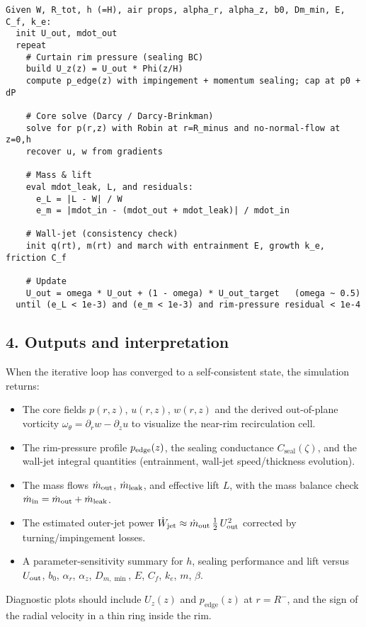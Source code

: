 \documentclass[11pt,a4paper]{article}
\begin{document}
\newpage
\begin{lstlisting}[style=codeblock,
  caption={Solver outline (code-ready)},
  label={lst:solver-outline}]
Given W, R_tot, h (=H), air props, alpha_r, alpha_z, b0, Dm_min, E, C_f, k_e:
  init U_out, mdot_out
  repeat
    # Curtain rim pressure (sealing BC)
    build U_z(z) = U_out * Phi(z/H)
    compute p_edge(z) with impingement + momentum sealing; cap at p0 + dP

    # Core solve (Darcy / Darcy-Brinkman)
    solve for p(r,z) with Robin at r=R_minus and no-normal-flow at z=0,h
    recover u, w from gradients

    # Mass & lift
    eval mdot_leak, L, and residuals:
      e_L = |L - W| / W
      e_m = |mdot_in - (mdot_out + mdot_leak)| / mdot_in

    # Wall-jet (consistency check)
    init q(rt), m(rt) and march with entrainment E, growth k_e, friction C_f

    # Update
    U_out = omega * U_out + (1 - omega) * U_out_target   (omega ~ 0.5)
  until (e_L < 1e-3) and (e_m < 1e-3) and rim-pressure residual < 1e-4
\end{lstlisting}




\subsection*{4. Outputs and interpretation}
When the iterative loop has converged to a self-consistent state, the simulation returns:
\begin{itemize}
  \item The core fields \(p(r,z)\), \(u(r,z)\), \(w(r,z)\) and the derived out-of-plane vorticity \(\omega_\theta=\partial_r w-\partial_z u\) to visualize the near-rim recirculation cell.
  \item The rim-pressure profile \(p_{\rm edge}(z)\), the sealing conductance \(C_{\mathrm{seal}}(\zeta)\), and the wall-jet integral quantities (entrainment, wall-jet speed/thickness evolution).
  \item The mass flows \(\dot m_{\rm out}\), \(\dot m_{\rm leak}\), and effective lift \(L\), with the mass balance check \(\dot m_{\rm in}=\dot m_{\rm out}+\dot m_{\rm leak}\).
  \item The estimated outer-jet power \(\dot W_{\rm jet}\approx \dot m_{\rm out}\,\tfrac12\,U_{\rm out}^2\) corrected by turning/impingement losses.
  \item A parameter-sensitivity summary for \(h\), sealing performance and lift versus \(U_{\rm out}\), \(b_0\), \(\alpha_r\), \(\alpha_z\), \(D_{m,\min}\), \(E\), \(C_f\), \(k_e\), \(m\), \(\beta\).
\end{itemize}
Diagnostic plots should include \(U_z(z)\) and \(p_{\mathrm{edge}}(z)\) at \(r=R^{-}\), and the sign of the radial velocity in a thin ring inside the rim.
\end{document}
